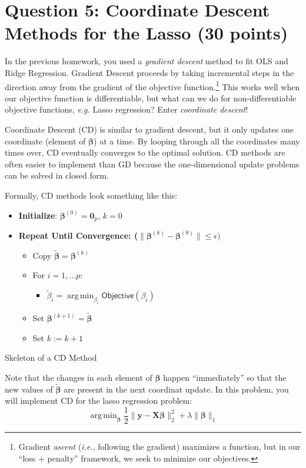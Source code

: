 \documentclass[10pt]{article}
\newcommand{\bzero}{\bm{0}}
\newcommand{\bX}{\bm{X}}
\newcommand{\by}{\bm{y}}
\newcommand{\bbeta}{\bm{\beta}}
\DeclareMathOperator{\argmin}{arg\,min}
\begin{document}
\section*{Question 5: Coordinate Descent Methods for the Lasso (30 points)}

In the previous homework, you used a \emph{gradient descent} method to fit OLS and Ridge Regression. Gradient Descent proceeds by taking incremental steps in the direction away from the gradient of the objective function.\footnote{Gradient \emph{ascent} (\emph{i.e.}, following the gradient) maximizes a function, but in our ``loss + penalty'' framework, we seek to minimize our objectives.} This works well when our objective function is differentiable, but what can we do for non-differentiable objective functions, \emph{e.g.} Lasso regression? Enter \emph{coordinate descent}!

Coordinate Descent (CD) is similar to gradient descent, but it only updates one coordinate (element of $\bbeta$) at a time. By looping through all the coordinates many times over, CD eventually converges to the optimal solution. CD methods are often easier to implement than GD because the one-dimensional update problems can be solved in closed form. 

Formally, CD methods look something like this: 
\begin{algorithm}
\begin{itemize}
\item \textbf{Initialize}: $\bbeta^{(0)} = \bzero_p$, $k = 0$
\item \textbf{Repeat Until Convergence: ($\|\bbeta^{(k)} - \bbeta^{(0)}\| \leq \epsilon)$}
\begin{itemize}
    \item Copy $\tilde{\bbeta} = \bbeta^{(k)}$
    \item For $i = 1, \dots p$:
    \begin{itemize}
        \item $\tilde{\beta}_i = \argmin_{\beta_i} \textsf{Objective}(\beta_i)$
    \end{itemize}
    \item Set $\bbeta^{(k+1)} = \tilde{\bbeta}$
    \item Set $k := k + 1$
\end{itemize}
\end{itemize}
    \caption{Skeleton of a CD Method}
\end{algorithm}

Note that the changes in each element of $\bbeta$ happen ``immediately'' so that the new values of $\tilde{\bbeta}$ are present in the next coordinat update.
In this problem, you will implement CD for the lasso regression problem: 
\[\argmin_{\bbeta} \frac{1}{2}\|\by - \bX\bbeta\|_2^2 + \lambda \|\bbeta\|_1\]
\end{document}
